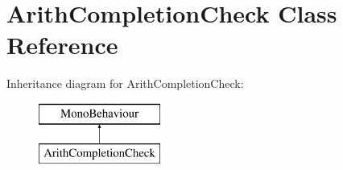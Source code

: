 \hypertarget{class_arith_completion_check}{}\section{Arith\+Completion\+Check Class Reference}
\label{class_arith_completion_check}
Inheritance diagram for Arith\+Completion\+Check\+:\begin{figure}[H]
\begin{center}
\leavevmode
\includegraphics[height=2.000000cm]{class_arith_completion_check}
\end{center}
\end{figure}
